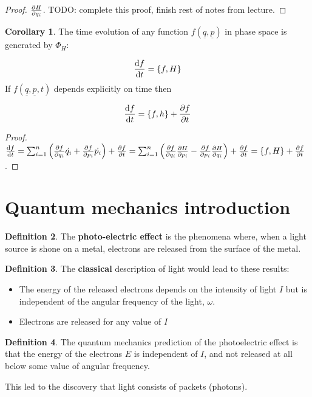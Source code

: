 \documentclass[12pt,a4paper]{article}
\theoremstyle{definition}
\newtheorem{definition}{Definition}[subsection]
\newtheorem{corollary}[definition]{Corollary}
\begin{document}
\begin{proof}
	$\diffp{H}{q_i}$. TODO: complete this proof, finish rest of notes from lecture.
\end{proof}

\begin{corollary}
	The time evolution of any function $f(\underline{q}, \underline{p})$ in phase space is generated by $\Phi_H$:

	\[ \diff{f}{t} = \{ f, H \} \]
	If $f(\underline{q}, \underline{p}, t)$ depends explicitly on time then

	\[ \diff{f}{t} = \{ f, h \} + \diffp{f}{t} \]
\end{corollary}

\begin{proof}
	$\diff{f}{t} = \sum_{i = 1}^n \left( \diffp{f}{q_i} \dot{q_i} + \diffp{f}{p_i} \dot{p_i} \right) + \diffp{f}{t} = \sum_{i = 1}^n \left( \diffp{f}{q_i} \diffp{H}{p_i} - \diffp{f}{p_i} \diffp{H}{q_i} \right) + \diffp{f}{t} = \{ f, H \} + \diffp{f}{t}$.
\end{proof}

\section{Quantum mechanics introduction}

\begin{definition}
	The \textbf{photo-electric effect} is the phenomena where, when a light source is shone on a metal, electrons are released from the surface of the metal.
\end{definition}

\begin{definition}
	The \textbf{classical} description of light would lead to these results:
	\begin{itemize}
		\item The energy of the released electrons depends on the intensity of light $I$ but is independent of the angular frequency of the light, $\omega$.
		\item Electrons are released for any value of $I$
	\end{itemize}
\end{definition}

\begin{definition}
	The quantum mechanics prediction of the photoelectric effect is that the energy of the electrons $E$ is independent of $I$, and not released at all below some value of angular frequency.

	This led to the discovery that light consists of packets (photons).
\end{definition}
\end{document}
